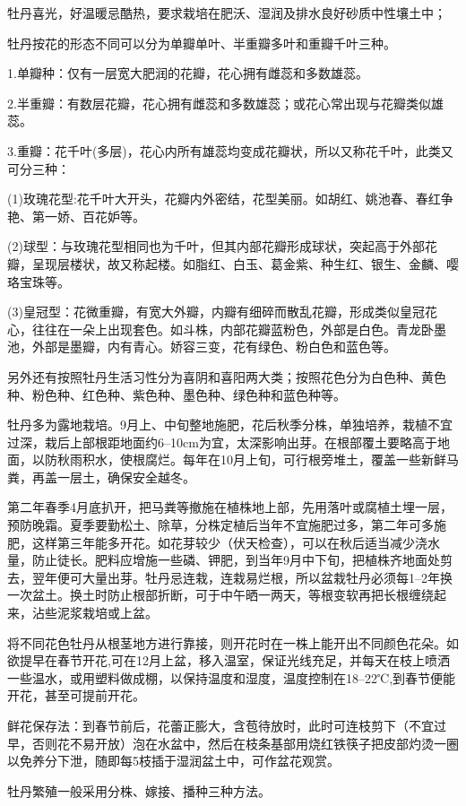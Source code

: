 \documentclass{ctexbook}
\begin{document}
牡丹喜光，好温暖忌酷热，要求栽培在肥沃、湿润及排水良好砂质中性壤土中；

牡丹按花的形态不同可以分为单瓣单叶、半重瓣多叶和重瓣千叶三种。

1.单瓣种：仅有一层宽大肥润的花瓣，花心拥有雌蕊和多数雄蕊。

2.半重瓣：有数层花瓣，花心拥有雌蕊和多数雄蕊；或花心常出现与花瓣类似雄蕊。

3.重瓣：花千叶(多层)，花心内所有雄蕊均变成花瓣状，所以又称花千叶，此类又可分三种：

(1)玫瑰花型:花千叶大开头，花瓣内外密结，花型美丽。如胡红、姚池春、春红争艳、第一娇、百花妒等。

(2)球型：与玫瑰花型相同也为千叶，但其内部花瓣形成球状，突起高于外部花瓣，呈现层楼状，故又称起楼。如脂红、白玉、葛金紫、种生红、银生、金麟、嘤珞宝珠等。

(3)皇冠型：花微重瓣，有宽大外瓣，内瓣有细碎而散乱花瓣，形成类似皇冠花心，往往在一朵上出现套色。如斗株，内部花瓣蓝粉色，外部是白色。青龙卧墨池，外部是墨瓣，内有青心。娇容三变，花有绿色、粉白色和蓝色等。

另外还有按照牡丹生活习性分为喜阴和喜阳两大类；按照花色分为白色种、黄色种、粉色种、红色种、紫色种、墨色种、绿色种和蓝色种等。

牡丹多为露地栽培。9月上、中旬整地施肥，花后秋季分株，单独培养，栽植不宜过深，栽后上部根距地面约6--10cm为宜，太深影响出芽。在根部覆土要略高于地面，以防秋雨积水，使根腐烂。每年在10月上旬，可行根旁堆土，覆盖一些新鲜马粪，再盖一层土，确保安全越冬。

第二年春季4月底扒开，把马粪等撤施在植株地上部，先用落叶或腐植土埋一层，预防晚霜。夏季要勤松土、除草，分株定植后当年不宜施肥过多，第二年可多施肥，这样第三年能多开花。如花芽较少（伏天检查），可以在秋后适当减少浇水量，防止徒长。肥料应增施一些磷、钾肥，到当年9月中下旬，把植株齐地面处剪去，翌年便可大量出芽。牡丹忌连栽，连栽易烂根，所以盆栽牡丹必须每1--2年换一次盆土。换土时防止根部折断，可于中午晒一两天，等根变软再把长根缠绕起来，沾些泥浆栽培或上盆。

将不同花色牡丹从根茎地方进行靠接，则开花时在一株上能开出不同颜色花朵。如欲提早在春节开花,可在12月上盆，移入温室，保证光线充足，并每天在枝上喷洒一些温水，或用塑料做成棚，以保持温度和湿度，温度控制在18--22℃,到春节便能开花，甚至可提前开花。

鲜花保存法：到春节前后，花蕾正膨大，含苞待放时，此时可连枝剪下（不宜过早，否则花不易开放）泡在水盆中，然后在枝条基部用烧红铁筷子把皮部灼烫一圈以免养分下泄，随即每5枝插于湿润盆土中，可作盆花观赏。

牡丹繁殖一般采用分株、嫁接、播种三种方法。
\end{document}
